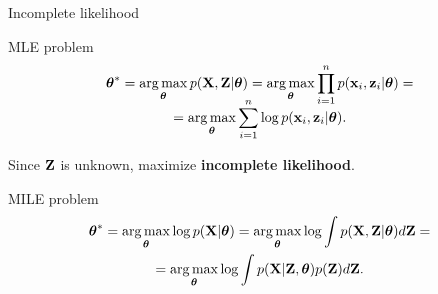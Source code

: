 \begin{frame}{Incomplete likelihood}
        \begin{block}{MLE problem}
            \vspace{-0.3cm}
            \begin{multline*}
                \vspace{-0.3cm}
                \btheta^* = \argmax_{\btheta} p(\bX, \bZ | \btheta) = \argmax_{\btheta} \prod_{i=1}^n p(\bx_i, \bz_i | \btheta) = \\ = \argmax_{\btheta} \sum_{i=1}^n \log p(\bx_i, \bz_i | \btheta).
            \end{multline*}
            \vspace{-0.3cm}
        \end{block}
	Since $\mathbf{Z}$ is unknown, maximize \textbf{incomplete likelihood}.
    \begin{block}{MILE problem}
        \vspace{-0.3cm}
    	\begin{multline*}
        	\boldsymbol{\theta}^* = \operatorname*{arg\,max}_{\boldsymbol{\theta}} \log p(\mathbf{X}| \boldsymbol{\theta}) = \operatorname*{arg\,max}_{\boldsymbol{\theta}} \log \int p(\mathbf{X}, \mathbf{Z} | \boldsymbol{\theta}) d \mathbf{Z} = \\ = \operatorname*{arg\,max}_{\boldsymbol{\theta}} \log \int p(\mathbf{X}| \mathbf{Z}, \boldsymbol{\theta}) p(\mathbf{Z}) d\mathbf{Z}.
    	\end{multline*}
        \vspace{-0.3cm}
	\end{block}
	
\end{frame}
